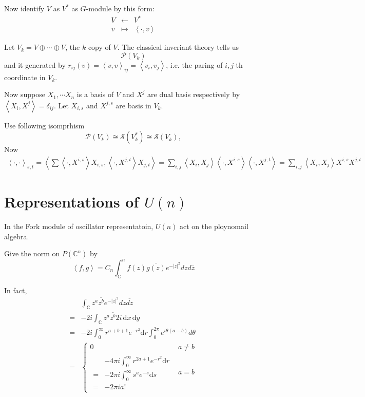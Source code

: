 \documentclass[12pt]{article}
\def\bC{{\mathbb{C}}}
\def\inn#1#2{\left\langle{#1},{#2}\right\rangle}
\def\abs#1{\left|{#1}\right|}
\def\css{\mathcal{S}}
\def\cpp{\mathcal{P}}
\begin{document}
Now identify $V$ as $V^*$ as $G$-module by this form:
\[
\begin{matrix}
V &\leftarrow& V^*\\
v & \mapsto & \inn{\cdot}{v}
\end{matrix}
\] 

Let $V_k = V\oplus \cdots \oplus V$, the $k$ copy of $V$. 
The classical inveriant theory tells us 
\[
\cpp(V_k) 
\]
and it generated by $r_{ij}(v) = \inn{v}{v}_{ij}= \inn{v_i}{v_j}$,
i.e. the paring of $i,j$-th 
coordinate in $V_k$.

Now suppose $X_1, \cdots X_n$ is a basis of $V$ and 
$X^j$ are dual basis respectively by $\inn{X_i}{X^j} = \delta_{ij}$.
Let $X_{i,s}$ and $X^{j,s}$ are basis in $V_k$. 

Use following isomprhism
\[
\cpp(V_k) \cong \css(V_k^*) \cong \css(V_k),
\]
Now
\[
\begin{split}
\inn{\cdot}{\cdot}_{s,t} = \inn{\sum \inn{\cdot}{X^{i,s}}X_{i,s}}{\inn{\cdot}{X^{j,t}}X_{j,t}} = \sum_{i,j} \inn{X_{i}}{X_{j}}\inn{\cdot}{X^{i,s}}\inn{\cdot}{X^{j,t}}
=\sum_{i,j} \inn{X_i}{X_j} X^{i,s}X^{j,t}
\end{split}
\]

\section{Representations of $U(n)$}
In the Fork module of oscillator representatoin,  
$U(n)$ act on the ploynomail algebra. 


Give the norm on $P(\bC^n)$ by
\[
\inn{f}{g} = C_n\int_\bC^nf(z)\overline{g(z)}e^{-\abs{z}^2}dzd\overline{z}
\]

\def\dd{\mathrm{d}}

In fact, 
\[
\begin{split}
 &\int_\bC z^a \overline{z^b} e^{-\abs{z}^2}dz\overline{dz} \\
=& -2i \int_\bC z^a \overline{z^b} 2i\,\dd x\,\dd y\\
=& -2i\int_{0}^\infty r^{a+b+1}e^{-r^2}\dd r \int_0^{2\pi} e^{i\theta(a-b)}d\theta\\
=& \begin{cases}
0 & a\neq b\\
\begin{split}
 &-4\pi i\int_0^\infty r^{2a+1} e^{-r^2} \dd r \\
=& -2\pi i \int_0^\infty s^a e^{-s}\dd s \\
=& -2\pi i a! 
\end{split}
& a=b 
\end{cases}
\end{split}
\]
\end{document}
